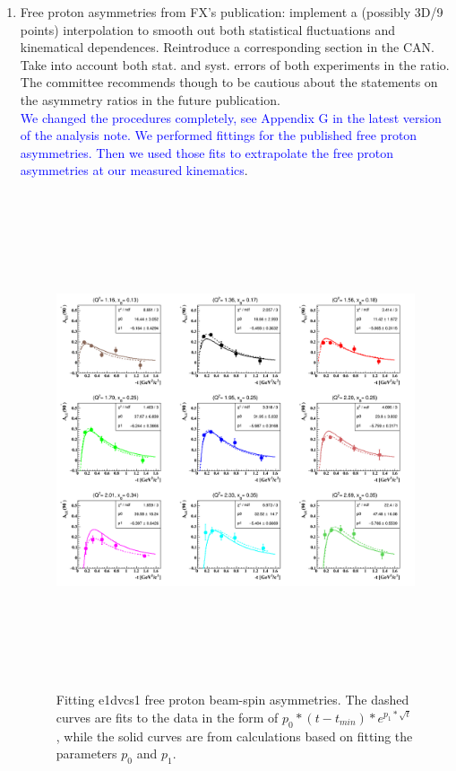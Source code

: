 \begin{enumerate}
\begin{enumerate}
\end{enumerate}

\item Free proton asymmetries from FX's publication: implement a (possibly 3D/9 
points) interpolation to smooth out both statistical fluctuations and 
kinematical dependences. Reintroduce a corresponding section in the CAN. Take 
into account both stat. and syst. errors of both experiments in the ratio. The 
committee recommends though to be cautious about the statements on the 
asymmetry ratios in the future publication.\\
  \textcolor{blue}{We changed the procedures completely, see Appendix G in the 
  latest version of the analysis note. We performed fittings for the published 
  free proton asymmetries. Then we used those fits to extrapolate the free 
  proton asymmetries at our measured kinematics}.\\
  \begin{figure}[tbp]
    \includegraphics[height=14.6cm]{fig/ALU-proton-fits.png}
    \caption{ Fitting e1dvcs1 free proton beam-spin asymmetries. The dashed 
    curves are fits to the data in the form of 
 $p_{0}*(t-t_{min})*e^{p_{1}*\sqrt{t}}$, while the solid curves are from 
 calculations based on fitting the parameters $p_{0}$ and $p_{1}$.}
    \label{fig:free-proton-alu-fits}
    \end{figure}


\end{enumerate}
